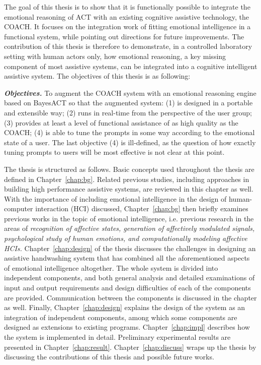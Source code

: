 The goal of this thesis is to show that it is functionally possible to integrate the emotional reasoning of ACT with an existing cognitive assistive technology, the COACH. It focuses on the integration work of fitting emotional intelligence in a functional system, while pointing out directions for future improvements. The contribution of this thesis is therefore to demonstrate, in a controlled laboratory setting with human actors only, how emotional reasoning, a key missing component of most assistive systems, can be integrated into a cognitive intelligent assistive system. The objectives of this thesis is as following:

\textbf{\textit{Objectives.}} To augment the COACH system with an emotional reasoning engine based on BayesACT so that the augmented system: (1) is designed in a portable and extensible way; (2) runs in real-time from the perspective of the user group; (3) provides at least a level of functional assistance of as high quality as the COACH; (4) is able to tune the prompts in some way according to the emotional state of a user. The last objective (4) is ill-defined, as the question of how exactly tuning prompts to users will be most effective is not clear at this point.

The thesis is structured as follows. Basic concepts used throughout the thesis are defined in Chapter~\ref{chap:bg}. Related previous studies, including approaches in building high performance assistive systems, are reviewed in this chapter as well. With the importance of including emotional intelligence in the design of human-computer interaction (HCI) discussed, Chapter~\ref{chap:bg} then briefly examines previous works in the topic of emotional intelligence, i.e. previous research in the areas of \textit{recognition of affective states, generation of affectively modulated signals, psychological study of human emotions, and computationally modeling affective HCIs.} Chapter~\ref{chap:design} of the thesis discusses the challenges in designing an assistive handwashing system that has combined all the aforementioned aspects of emotional intelligence altogether. The whole system is divided into independent components, and both general analysis and detailed examinations of input and output requirements and design difficulties of each of the components are provided. Communication between the components is discussed in the chapter as well. Finally, Chapter~\ref{chap:design} explains the design of the system as an integration of independent components, among which some components are designed as extensions to existing programs. Chapter~\ref{chap:impl} describes how the system is implemented in detail. Preliminary experimental results are presented in Chapter~\ref{chap:result}. Chapter~\ref{chap:discuss} wraps up the thesis by discussing the contributions of this thesis and possible future works.
